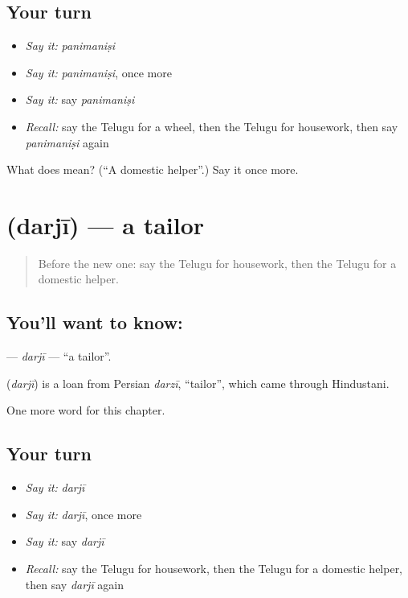 \subsection*{Your turn}
\begin{itemize}
\raggedright
  \item \emph{Say it:} \emph{panimaniṣi}
  \item \emph{Say it:} \emph{panimaniṣi}, once more
  \item \emph{Say it:} say \emph{panimaniṣi}
  \item \emph{Recall:} say the Telugu for a wheel, then the Telugu for housework, then say \emph{panimaniṣi} again
\end{itemize}

\begin{tcolorbox}[breakable,colback=teal!4,colframe=teal!35!black,title={Before you move on}]
What does  mean? (\textquotedblleft{}A domestic helper\textquotedblright{}.) Say it once more.
\end{tcolorbox}
\section[\texorpdfstring{\te{దర్జీ} (darjī)}{దర్జీ (darjī)}]{ (darjī) — a tailor}

\label{lesson:TE-C194-darji}



\begin{quote}
Before the new one: say the Telugu for housework, then the Telugu for a domestic helper.
\end{quote}

\subsection*{You'll want to know: }
\textbf{} — \emph{darjī} — \textquotedblleft{}a tailor\textquotedblright{}.

\begin{cousinweb}
\textbf{} (\emph{darjī}) is a loan from Persian \emph{darzī}, \textquotedblleft{}tailor\textquotedblright{}, which came through Hindustani.
\end{cousinweb}

\begin{grammarlens}[title={What you've built}]
One more word for this chapter.
\end{grammarlens}

\subsection*{Your turn}
\begin{itemize}
\raggedright
  \item \emph{Say it:} \emph{darjī}
  \item \emph{Say it:} \emph{darjī}, once more
  \item \emph{Say it:} say \emph{darjī}
  \item \emph{Recall:} say the Telugu for housework, then the Telugu for a domestic helper, then say \emph{darjī} again
\end{itemize}

